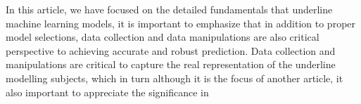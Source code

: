
\par
In this article, we have focused on the detailed fundamentals that underline machine learning models, it is important to emphasize that in addition to proper model selections, data collection and data manipulations are also critical perspective to achieving accurate and robust prediction. Data collection and manipulations are critical to capture the real representation of the underline modelling subjects, which in turn although it is the focus of another article, it also important to appreciate the significance in 
\par 
